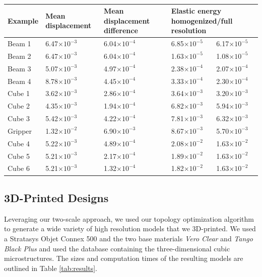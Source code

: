 \begin{table}
	\centering
	\footnotesize
	\caption{} 
	{\begin{tabularx}{\linewidth}{ |X| X | X | X | X | }
			\hline
			Example & Mean displacement & Mean displacement difference & \multicolumn{2}{p{3.2cm}|}{\centering Elastic energy \newline homogenized/full resolution}\\ \hline
			Beam 1 & 6.47$\times10^{-3}$ & 6.04$\times10^{-4}$ & 6.85$\times10^{-5}$ & 6.17$\times10^{-5}$ \\
			Beam 2 & 6.47$\times10^{-3}$ & 6.04$\times10^{-4}$ & 1.63$\times10^{-5}$ & 1.08$\times10^{-5}$ \\
			Beam 3 & 5.07$\times10^{-3}$ & 4.97$\times10^{-4}$ & 2.38$\times10^{-4}$ & 2.07$\times10^{-4}$ \\
			Beam 4 & 8.78$\times10^{-3}$ & 4.45$\times10^{-4}$ & 3.33$\times10^{-4}$ & 2.30$\times10^{-4}$ \\
			Cube 1 & 3.62$\times10^{-3}$ & 2.86$\times10^{-4}$ & 3.64$\times10^{-3}$ & 3.20$\times10^{-3}$ \\
			Cube 2 & 4.35$\times10^{-3}$ & 1.94$\times10^{-4}$ & 6.82$\times10^{-3}$ & 5.94$\times10^{-3}$ \\
			Cube 3 & 5.42$\times10^{-3}$ & 4.22$\times10^{-4}$ & 7.81$\times10^{-3}$ & 6.32$\times10^{-3}$ \\
			Gripper& 1.32$\times10^{-2}$ & 6.90$\times10^{-3}$ & 8.67$\times10^{-3}$ & 5.70$\times10^{-3}$ \\
			Cube 4 & 5.22$\times10^{-3}$ & 4.89$\times10^{-4}$ & 2.08$\times10^{-2}$ & 1.63$\times10^{-2}$ \\
			Cube 5 & 5.21$\times10^{-3}$ & 2.17$\times10^{-4}$ & 1.89$\times10^{-2}$ & 1.63$\times10^{-2}$ \\
			Cube 6 & 5.21$\times10^{-3}$ & 1.32$\times10^{-4}$ & 1.82$\times10^{-2}$ & 1.63$\times10^{-2}$ \\
			\hline
		\end{tabularx} }
		\label{tab:hom}
	\end{table}
	
	\subsection{3D-Printed Designs}
	
	Leveraging our two-scale approach, we used our topology optimization algorithm to generate a wide variety of high resolution models that we 3D-printed. We used a Stratasys Objet Connex 500 and the two base materials \emph{Vero Clear} and \emph{Tango Black Plus} and used the database containing the three-dimensional cubic microstructures. The sizes and computation times of the resulting models are outlined in Table \ref{tab:results}. 
	
